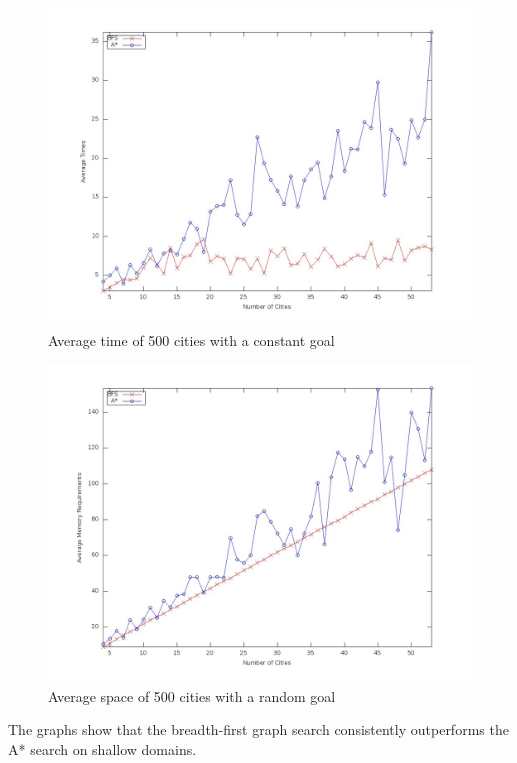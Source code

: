 \documentclass[letterpaper]{article}
\begin{document}
\begin{figure}[!htb]
	\centering
	\includegraphics[scale=0.22]{./pics/average_time_500cities_random_goal.jpg}
	\caption{Average time of 500 cities with a constant goal}
	\label{fig:avg_time_500_cities_random_goal}
\end{figure}
\begin{figure}[!htb]
	\centering
	\includegraphics[scale=0.22]{./pics/avg_space_500_cities_random_goal.jpg}
	\caption{Average space of 500 cities with a random goal}
	\label{fig:avg_space_500_cities_random_goal}
\end{figure}
The graphs show that the breadth-first graph search consistently outperforms the A* search on shallow
domains.
\end{document}
